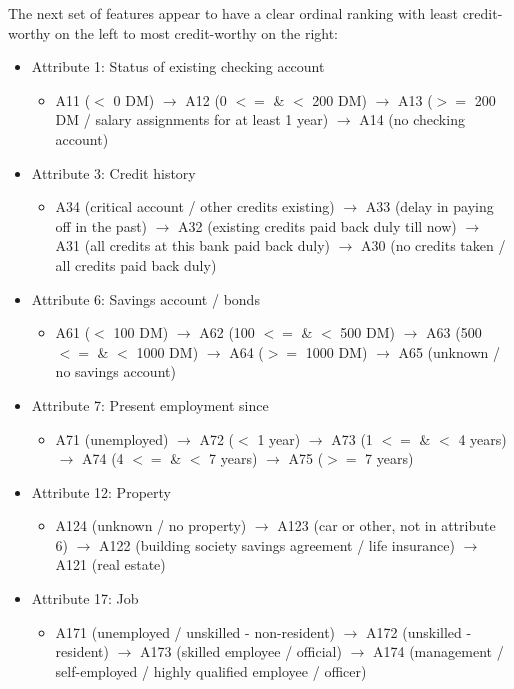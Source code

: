 \documentclass{article}
\begin{document}
    The next set of features appear to have a clear ordinal ranking with least credit-worthy
    on the left to most credit-worthy on the right:
    \begin{itemize}
        \item Attribute 1: Status of existing checking account
        \begin{itemize}
            \item A11 ($<$ 0 DM) $\to$ A12 (0 $<=$ \& $<$ 200 DM) $\to$ A13 ($>=$ 200 DM / salary assignments for at least 1 year) $\to$ A14 (no checking account)
        \end{itemize}
        \item Attribute 3: Credit history
        \begin{itemize}
            \item A34 (critical account / other credits existing) $\to$ A33 (delay in paying off in the past) $\to$ A32 (existing credits paid back duly till now) $\to$ A31 (all credits at this bank paid back duly) $\to$ A30 (no credits taken / all credits paid back duly)
        \end{itemize}
        \item Attribute 6: Savings account / bonds
        \begin{itemize}
            \item A61 ($<$ 100 DM) $\to$ A62 (100 $<=$ \& $<$ 500 DM) $\to$ A63 (500 $<=$ \& $<$ 1000 DM) $\to$ A64 ($>=$ 1000 DM) $\to$ A65 (unknown / no savings account)
        \end{itemize}
        \item Attribute 7: Present employment since
        \begin{itemize}
            \item A71 (unemployed) $\to$ A72 ($<$ 1 year) $\to$ A73 (1 $<=$ \& $<$ 4 years) $\to$ A74 (4 $<=$ \& $<$ 7 years) $\to$ A75 ($>=$ 7 years)
        \end{itemize}
        \item Attribute 12: Property
        \begin{itemize}
            \item A124 (unknown / no property) $\to$ A123 (car or other, not in attribute 6) $\to$ A122 (building society savings agreement / life insurance) $\to$ A121 (real estate)
        \end{itemize}
        \item Attribute 17: Job
        \begin{itemize}
            \item A171 (unemployed / unskilled - non-resident) $\to$ A172 (unskilled - resident) $\to$ A173 (skilled employee / official) $\to$ A174 (management / self-employed / highly qualified employee / officer)
        \end{itemize}
    \end{itemize}
\end{document}
